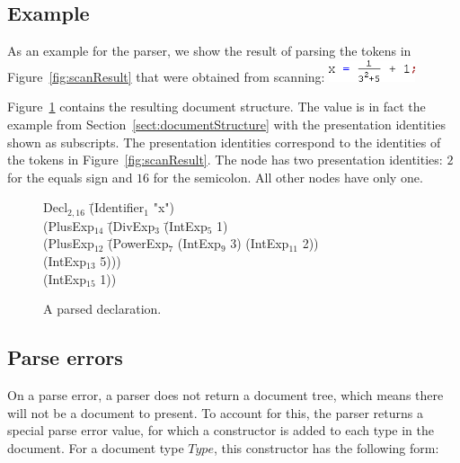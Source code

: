 \documentclass[12pt]{article}
\begin{document}
\subsection{Example} \label{sect:parseExample}

As an example for the parser, we show the result of parsing the tokens in Figure~\ref{fig:scanResult} that were obtained from scanning: \includegraphics[width=1in]{images/scanFrac} 

Figure~\ref{fig:parseResult} contains the resulting document structure. The value is in fact the example from Section~\ref{sect:documentStructure} with the presentation identities shown as subscripts. The presentation identities correspond to the identities of the tokens in Figure~\ref{fig:scanResult}. The  node has two presentation identities: $2$ for the equals sign and $16$ for the semicolon. All other nodes have only one. 

\begin{figure}
\begin{center}
\begin{footnotesize}
\begin{tabbedCode}
Decl$_{2,16}$ \= (Identifier$_1$ "x")\\ 
              \> (PlusExp$_{14}$ \= (DivExp$_3$ \= (IntExp$_5$ 1) \\
              \>                 \>             \> (PlusExp$_{12}$ \= (PowerExp$_7$ (IntExp$_9$ 3) (IntExp$_{11}$ 2))\\
              \>                 \>             \>                 \> (IntExp$_{13}$ 5)))\\
              \>                 \>(IntExp$_{15}$ 1))
\end{tabbedCode}
\end{footnotesize}
\end{center}
\caption{A parsed declaration.} \label{fig:parseResult} 
\end{figure}

\subsection{Parse errors} \label{sect:parseScanErrors}

On a parse error, a parser does not return a document tree, which means there will not be a document to present. To account for this, the parser returns a special parse error value, for which a constructor is added to each type in the document. For a document type $Type$, this constructor has the following form:
\end{document}
